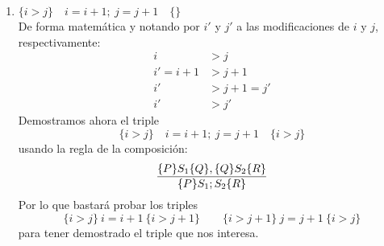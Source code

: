 \begin{ejercicio}
\begin{enumerate}
        \item $\{i > j\} \quad i = i + 1;~j = j + 1 \quad \{ \}$\\
            De forma matemática y notando por $i'$ y $j'$ a las modificaciones de $i$ y $j$, respectivamente:
            \begin{align*}
                i &> j \\
                i' = i+1 &> j+1\\
                i' &> j+1 = j' \\
                i' &> j'
            \end{align*}
            Demostramos ahora el triple
            \begin{equation*}
                \{i > j\} \quad i = i + 1;~j = j + 1 \quad \{i>j\}
            \end{equation*}
            usando la regla de la composición:
            \begin{equation*}
                \dfrac{\{P\}S_1\{Q\}, \{Q\}S_2\{R\}}{\{P\}S_1;S_2\{R\}} \\
            \end{equation*}
                Por lo que bastará probar los triples
                \begin{equation*}
                    \{i>j\}\ i=i+1\ \{i>j+1\} \qquad \{i>j+1\}\ j=j+1\ \{i>j\}
                \end{equation*}
                para tener demostrado el triple que nos interesa.


\end{enumerate}
\end{ejercicio}
